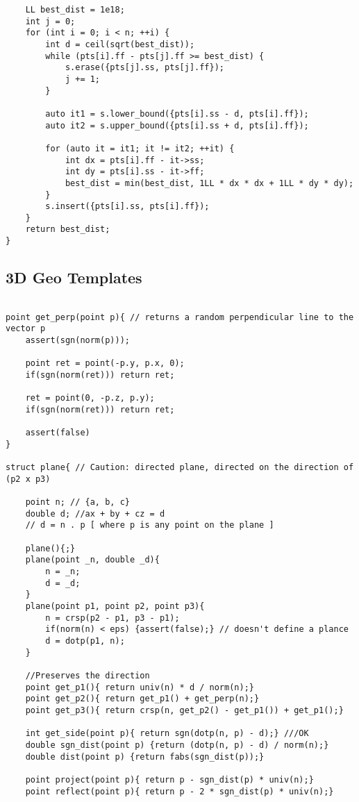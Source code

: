 \documentclass[10pt,a4paper,onesided]{article}
\begin{document}
\begin{multicols*}{3}
\begin{lstlisting}
    LL best_dist = 1e18;
    int j = 0;
    for (int i = 0; i < n; ++i) {
        int d = ceil(sqrt(best_dist));
        while (pts[i].ff - pts[j].ff >= best_dist) {
            s.erase({pts[j].ss, pts[j].ff});
            j += 1;
        }

        auto it1 = s.lower_bound({pts[i].ss - d, pts[i].ff});
        auto it2 = s.upper_bound({pts[i].ss + d, pts[i].ff});

        for (auto it = it1; it != it2; ++it) {
            int dx = pts[i].ff - it->ss;
            int dy = pts[i].ss - it->ff;
            best_dist = min(best_dist, 1LL * dx * dx + 1LL * dy * dy);
        }
        s.insert({pts[i].ss, pts[i].ff});
    }
    return best_dist;
}
\end{lstlisting}
\subsection{3D Geo Templates}
\begin{lstlisting}

point get_perp(point p){ // returns a random perpendicular line to the vector p
    assert(sgn(norm(p)));

    point ret = point(-p.y, p.x, 0);
    if(sgn(norm(ret))) return ret;

    ret = point(0, -p.z, p.y);
    if(sgn(norm(ret))) return ret;

    assert(false)
}

struct plane{ // Caution: directed plane, directed on the direction of (p2 x p3)

	point n; // {a, b, c}
	double d; //ax + by + cz = d
	// d = n . p [ where p is any point on the plane ]

	plane(){;}
	plane(point _n, double _d){
        n = _n;
        d = _d;
	}
	plane(point p1, point p2, point p3){
		n = crsp(p2 - p1, p3 - p1);
		if(norm(n) < eps) {assert(false);} // doesn't define a plance
		d = dotp(p1, n);
	}

    //Preserves the direction
	point get_p1(){ return univ(n) * d / norm(n);}
	point get_p2(){ return get_p1() + get_perp(n);}
	point get_p3(){ return crsp(n, get_p2() - get_p1()) + get_p1();}

	int get_side(point p){ return sgn(dotp(n, p) - d);} ///OK
	double sgn_dist(point p) {return (dotp(n, p) - d) / norm(n);}
	double dist(point p) {return fabs(sgn_dist(p));}

	point project(point p){ return p - sgn_dist(p) * univ(n);}
	point reflect(point p){ return p - 2 * sgn_dist(p) * univ(n);}


\end{lstlisting}
\end{multicols*}
\end{document}
